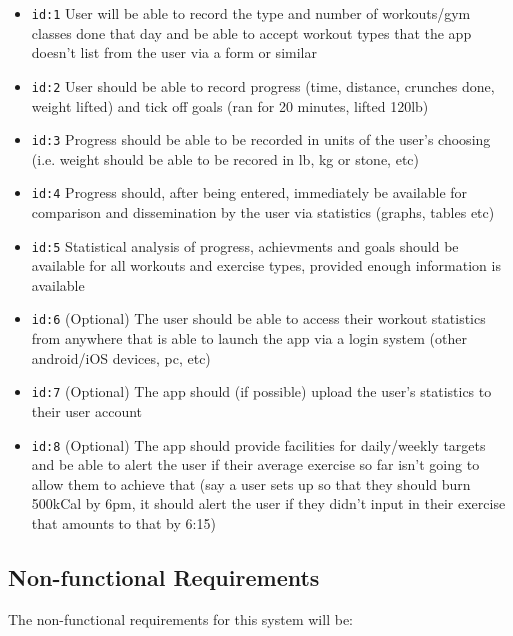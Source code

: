 \documentclass{article}
\begin{document}
\begin{itemize}

	\item \verb!id:1! User will be able to record the type and number of workouts/gym classes done that day and be able to accept workout types that the app doesn't list from the user via a form or similar
	\item \verb!id:2! User should be able to record progress (time, distance, crunches done, weight lifted) and tick off goals (ran for 20 minutes, lifted 120lb)
	\item \verb!id:3! Progress should be able to be recorded in units of the user's choosing (i.e. weight should be able to be recored in lb, kg or stone, etc)	
	\item \verb!id:4! Progress should, after being entered, immediately be available for comparison and dissemination by the user via statistics (graphs, tables etc)
	\item \verb!id:5! Statistical analysis of progress, achievments and goals should be available for all workouts and exercise types, provided enough information is available
	\item \verb!id:6! (Optional) The user should be able to access their workout statistics from anywhere that is able to launch the app via a login system (other android/iOS devices, pc, etc)
	\item \verb!id:7! (Optional) The app should (if possible) upload the user's statistics to their user account 
	\item \verb!id:8! (Optional) The app should provide facilities for daily/weekly targets and be able to alert the user if their average exercise so far isn't going to allow them to achieve that (say a user sets up so that they should burn 500kCal by 6pm, it should alert the user if they didn't input in their exercise that amounts to that by 6:15)

\end{itemize}

\subsection{Non-functional Requirements}

The non-functional requirements for this system will be:
\end{document}
